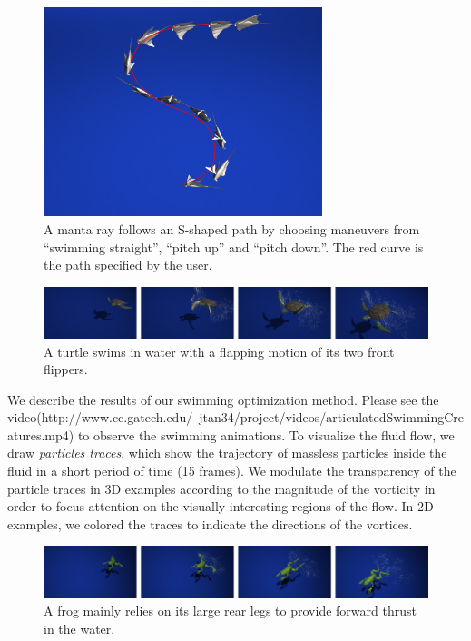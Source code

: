 \begin{figure}[!b]
\centering
\includegraphics[width=3.2in]{figures/manta_path2.eps}
\caption{A manta ray follows an S-shaped path by choosing maneuvers from ``swimming straight'', ``pitch up'' and ``pitch down''. The red curve is the path specified by the user.}
\label{fig:manta_path}
\end{figure}

\begin{figure}[ht]
\centering
\includegraphics[width=\textwidth]{figures/turtle.eps}
\caption{A turtle swims in water with a flapping motion of its two front flippers. }
\label{fig:turtle}
\end{figure}

We describe the results of our swimming optimization method.  Please see the video(http://www.cc.gatech.edu/~jtan34/project/videos/articulatedSwimmingCreatures.mp4) to observe the swimming
animations.  To visualize the fluid flow, we draw \emph{particles traces},
which show the trajectory of massless particles inside the fluid in a
short period of time (15 frames). We modulate the transparency of the
particle traces in 3D examples according to the magnitude of the vorticity
in order to focus attention on the visually interesting regions of the
flow.  In 2D examples, we colored the traces to indicate the directions of
the vortices.

\begin{figure}[ht]
\centering
\includegraphics[width=\textwidth]{figures/frog.eps}
\caption{A frog mainly relies on its large rear legs to provide forward thrust in the water.}
\label{fig:frog}
\end{figure}


